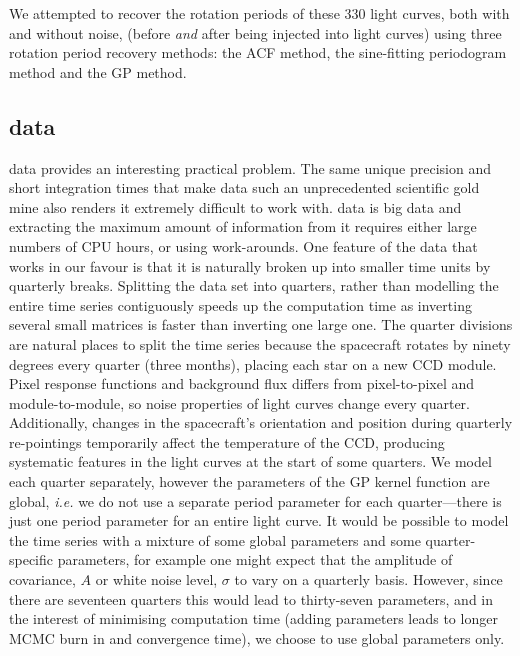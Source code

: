 We attempted to recover the rotation periods of these 330 light curves, both
with and without noise, (\ie before {\it and} after being injected into
\kepler light curves) using three rotation period recovery methods: the ACF
method, the sine-fitting periodogram method and the GP method.

\subsection{\kepler data}
\kepler data provides an interesting practical problem.
The same unique precision and short integration times that make \kepler
data such an unprecedented scientific gold mine also renders it extremely
difficult to work with.
\kepler data is big data and extracting the maximum amount of information
from it requires either large numbers of CPU hours, or using work-arounds.
One feature of the \kepler data that works in our favour is that it is
naturally broken up into smaller time units by quarterly breaks.
Splitting the data set into quarters, rather than modelling the entire time
series contiguously speeds up the computation time as inverting several
small matrices is faster than inverting one large one.
The \kepler quarter divisions are natural places to split the time series
because the spacecraft rotates by ninety degrees every quarter (three months),
placing each star on a new CCD module.
Pixel response functions and background flux differs from pixel-to-pixel and
module-to-module, so noise properties of \kepler light curves change every
quarter.
Additionally, changes in the spacecraft's orientation and position during
quarterly re-pointings temporarily affect the temperature of the CCD,
producing systematic features in the light curves at the start of some
quarters.
We model each quarter separately, however the parameters of the GP kernel
function are global, {\it i.e.} we do not use a separate period parameter for
each quarter---there is just one period parameter for an entire light curve.
It would be possible to model the time series with a mixture of some global
parameters and some quarter-specific parameters, for example one might expect
that the amplitude of covariance, $A$ or white noise level, $\sigma$ to vary
on a quarterly basis.
However, since there are seventeen quarters this would lead to thirty-seven
parameters, and in the interest of minimising computation time (adding
parameters leads to longer MCMC burn in and convergence time), we choose to
use global parameters only.
